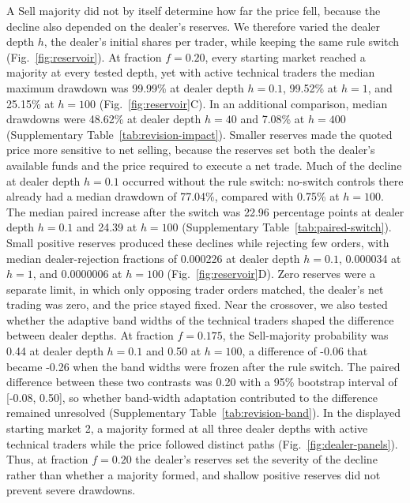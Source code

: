 A Sell majority did not by itself determine how far the price fell,
because the decline also depended on the dealer's reserves. We
therefore varied the dealer depth $h$, the dealer's initial shares per
trader, while keeping the same rule switch (Fig.~\ref{fig:reservoir}). At fraction
$f=0.20$, every starting market reached a majority at every tested
depth, yet with active technical traders the median maximum drawdown
was 99.99\% at dealer depth $h=0.1$, 99.52\% at $h=1$, and 25.15\% at $h=100$
(Fig.~\ref{fig:reservoir}C). In an additional comparison, median drawdowns were
48.62\% at dealer depth $h=40$ and 7.08\% at $h=400$
(Supplementary Table~\ref{tab:revision-impact}). Smaller reserves made the quoted price
more sensitive to net selling, because the reserves set both the
dealer's available funds and the price required to execute a net trade.
Much of the decline at dealer depth $h=0.1$ occurred without the rule
switch: no-switch controls there already had a median drawdown of
77.04\%, compared with 0.75\% at $h=100$. The median paired
increase after the switch was 22.96 percentage points at dealer depth
$h=0.1$ and 24.39 at $h=100$ (Supplementary Table~\ref{tab:paired-switch}).
Small positive reserves produced these declines while rejecting few
orders, with median dealer-rejection fractions of 0.000226 at dealer
depth $h=0.1$, 0.000034 at $h=1$, and 0.0000006 at $h=100$
(Fig.~\ref{fig:reservoir}D). Zero reserves were a separate limit, in which only
opposing trader orders matched, the dealer's net trading was zero, and
the price stayed fixed. Near the crossover, we also tested whether the
adaptive band widths of the technical traders shaped the difference
between dealer depths. At fraction $f=0.175$, the Sell-majority
probability was 0.44 at dealer depth $h=0.1$ and 0.50 at $h=100$, a
difference of -0.06 that became -0.26 when the band widths were frozen
after the rule switch. The paired difference between these two
contrasts was 0.20 with a 95\% bootstrap interval of
[-0.08, 0.50], so whether band-width adaptation contributed to the
difference remained unresolved (Supplementary Table~\ref{tab:revision-band}). In the
displayed starting market 2, a majority formed at all three dealer
depths with active technical traders while the price followed distinct
paths (Fig.~\ref{fig:dealer-panels}). Thus, at fraction $f=0.20$ the dealer's
reserves set the severity of the decline rather than whether a majority
formed, and shallow positive reserves did not prevent severe drawdowns.

